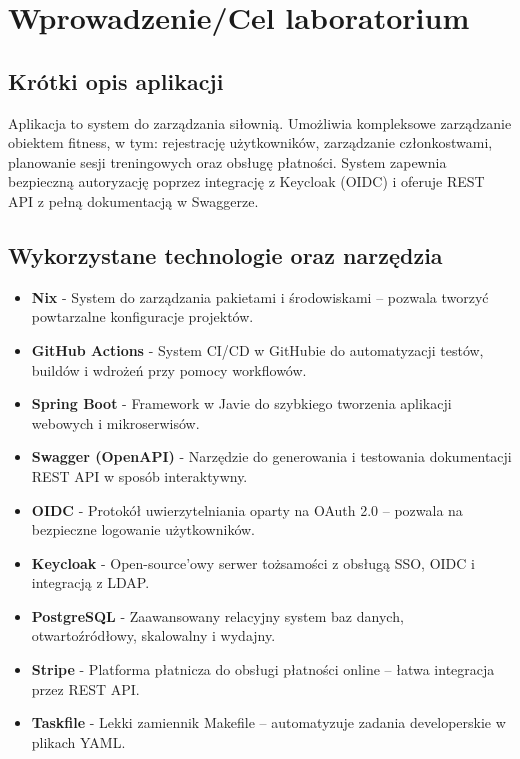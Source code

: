 \documentclass[../../spr.tex]{subfiles}
\begin{document}
\section{Wprowadzenie/Cel laboratorium}

\subsection{Krótki opis aplikacji}
Aplikacja to system do zarządzania siłownią.
Umożliwia kompleksowe zarządzanie obiektem fitness, 
w tym: rejestrację użytkowników, zarządzanie członkostwami, 
planowanie sesji treningowych oraz obsługę płatności. 
System zapewnia bezpieczną autoryzację poprzez integrację z Keycloak (OIDC) 
i oferuje REST API z pełną dokumentacją w Swaggerze.
\subsection{Wykorzystane technologie oraz narzędzia}


  \begin{itemize}
    \item \textbf{Nix} - System do zarządzania pakietami i środowiskami – pozwala tworzyć powtarzalne konfiguracje projektów.
    \item \textbf{GitHub Actions} -
    System CI/CD w GitHubie do automatyzacji testów, buildów i wdrożeń przy pomocy workflowów.

    \item \textbf{Spring Boot} -
    Framework w Javie do szybkiego tworzenia aplikacji webowych i mikroserwisów.

    \item \textbf{Swagger (OpenAPI)} -
    Narzędzie do generowania i testowania dokumentacji REST API w sposób interaktywny.

    \item \textbf{OIDC} -
    Protokół uwierzytelniania oparty na OAuth 2.0 – pozwala na bezpieczne logowanie użytkowników.

    \item \textbf{Keycloak} -
    Open-source’owy serwer tożsamości z obsługą SSO, OIDC i integracją z LDAP.

    \item \textbf{PostgreSQL} -
    Zaawansowany relacyjny system baz danych, otwartoźródłowy, skalowalny i wydajny.

    \item \textbf{Stripe} -
    Platforma płatnicza do obsługi płatności online – łatwa integracja przez REST API.

    \item \textbf{Taskfile} -
    Lekki zamiennik Makefile – automatyzuje zadania developerskie w plikach YAML.
  \end{itemize}
\end{document}
